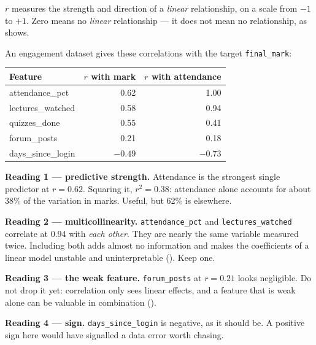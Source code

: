\begin{definitionbox}
$r$ measures the strength and direction of a \emph{linear} relationship, on a scale
from $-1$ to $+1$. Zero means no \emph{linear} relationship --- it does not mean no
relationship, as  shows.
\end{definitionbox}

\begin{worked}
An engagement dataset gives these correlations with the target
\texttt{final\_mark}:

\smallskip
\begin{center}
\begin{tabular}{@{}lrr@{}}
\toprule
\textbf{Feature} & \textbf{$r$ with mark} & \textbf{$r$ with attendance} \\
\midrule
attendance\_pct     & 0.62 & 1.00 \\
lectures\_watched   & 0.58 & 0.94 \\
quizzes\_done       & 0.55 & 0.41 \\
forum\_posts        & 0.21 & 0.18 \\
days\_since\_login  & $-0.49$ & $-0.73$ \\
\bottomrule
\end{tabular}
\end{center}

\smallskip
\textbf{Reading 1 --- predictive strength.} Attendance is the strongest single
predictor at $r = 0.62$. Squaring it, $r^2 = 0.38$: attendance alone accounts for
about 38\% of the variation in marks. Useful, but 62\% is elsewhere.

\textbf{Reading 2 --- multicollinearity.} \texttt{attendance\_pct} and
\texttt{lectures\_watched} correlate at 0.94 with \emph{each other}. They are
nearly the same variable measured twice. Including both adds almost no information
and makes the coefficients of a linear model unstable and uninterpretable
(). Keep one.

\textbf{Reading 3 --- the weak feature.} \texttt{forum\_posts} at $r = 0.21$ looks
negligible. Do not drop it yet: correlation only sees linear effects, and a
feature that is weak alone can be valuable in combination ().

\textbf{Reading 4 --- sign.} \texttt{days\_since\_login} is negative, as it should
be. A positive sign here would have signalled a data error worth chasing.
\end{worked}

